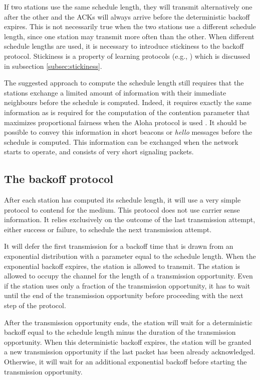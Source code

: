 \documentclass[twocolumn]{svjour3}          \smartqed  \usepackage{graphicx}
\begin{document}
If two stations use the same schedule length, they will transmit alternatively one after the other and the ACKs will always arrive before the deterministic backoff expires.
This is not necessarily true when the two stations use a different schedule length, since one station may transmit more often than the other.
When different schedule lengths are used, it is necessary to introduce stickiness to the backoff protocol.
Stickiness is a property of learning protocols (e.g., \cite{fang2010dlm}) which is discussed in subsection \ref{subsec:stickiness}.

The suggested approach to compute the schedule length still requires that the stations exchange a limited amount of information with their immediate neighbours before the schedule is computed.
Indeed, it requires exactly the same information as is required for the computation of the contention parameter that maximizes proportional fairness when the Aloha protocol is used \cite{kar2004apf}.
It should be possible to convey this information in short beacons or \emph{hello} messages before the schedule is computed.
This information can be exchanged when the network starts to operate, and consists of very short signaling packets.

\subsection{The backoff protocol}

After each station has computed its schedule length, it will use a very simple protocol to contend for the medium.
This protocol does not use carrier sense information. 
It relies exclusively on the outcome of the last transmission attempt, 
either success or failure, to schedule the next transmission attempt.

It will defer the first transmission for a backoff time that is drawn from an exponential distribution with a parameter equal to the schedule length.
When the exponential backoff expires, the station is allowed to transmit.
The station is allowed to occupy the channel for the length of a transmission opportunity.
Even if the station uses only a fraction of the transmission opportunity, it has to wait until the end of the transmission opportunity before proceeding with the next step of the protocol.

After the transmission opportunity ends, the station will wait for a deterministic backoff equal to the schedule length minus the duration of the transmission opportunity.
When this deterministic backoff expires, the station will be granted a new transmission opportunity if the last packet has been already acknowledged.
Otherwise, it will wait for an additional exponential backoff before starting the transmission opportunity.
\end{document}
